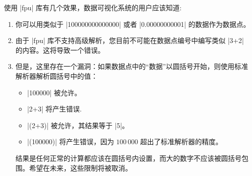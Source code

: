 使用 |fpu| 库有几个效果，数据可视化系统的用户应该知道:
%
\begin{enumerate}
    \item 你可以用类似于 |100000000000000| 或者 |0.00000000001| 的数据作为数据点。
    \item 由于 |fpu| 库不支持高级解析，您目前不可能在数据点编号中编写类似 |3+2| 的内容。这将导致一个错误。
    \item 但是，这里存在一个漏洞：如果数据点中的``数据''以圆括号开始，则使用标准解析器解析圆括号中的值：
        \begin{itemize}
            \item |100000| 被允许。
            \item |2+3| 将产生错误.
            \item |(2+3)| 被允许，其结果等于 |5|。
            \item |(100000)| 将产生错误，因为 $100\,000$ 超出了标准解析器的精度。
        \end{itemize}
        结果是任何正常的计算都应该在圆括号内设置，而大的数字不应该被圆括号包围。希望在未来，这些限制将被取消。
\end{enumerate}


